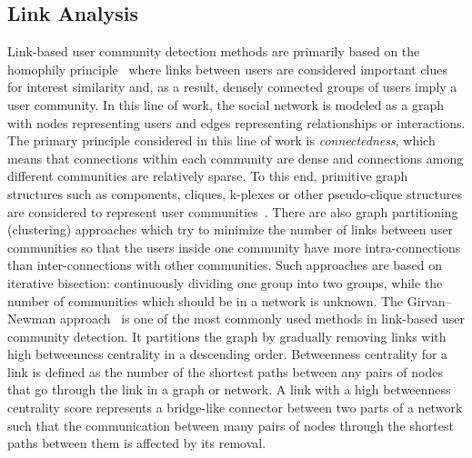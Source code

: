\documentclass[sigconf]{acmart}
\begin{document}
\subsection{Link Analysis}
Link-based user community detection methods are primarily based on the homophily principle~\cite{homophily} where links between users are considered important clues for interest similarity and, as a result, densely connected groups of users imply a user community. In this line of work, the social network is modeled as a graph with nodes representing users and edges representing relationships or interactions. The primary principle considered in this line of work is \textit{connectedness}, which means that connections within each community are dense and connections among different communities are relatively sparse. To this end, primitive graph structures such as components, cliques, k-plexes or other pseudo-clique structures are considered to represent user communities~\cite{DBLP:conf/kdd/ConteMSGMV18, FORTUNATO201075, lancichinetti2009community}. There are also graph partitioning (clustering) approaches which try to minimize the number of links between user communities so that the users inside one community have more intra-connections than inter-connections with other communities. Such approaches are based on iterative bisection: continuously dividing one group into two groups, while the number of communities which should be in a network is unknown. The Girvan–Newman approach~\cite{girvan2002community} is one of the most commonly used methods in link-based user community detection. It partitions the graph by gradually removing links with high betweenness centrality in a descending order. Betweenness centrality for a link is defined as the number of the shortest paths between any pairs of nodes that go through the link in a graph or network. A link with a high betweenness centrality score represents a bridge-like connector between two parts of a network such that the communication between many pairs of nodes through the shortest paths between them is affected by its removal. 
\end{document}
